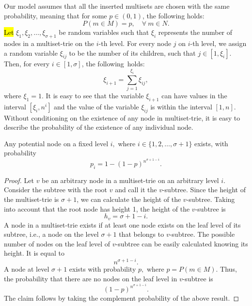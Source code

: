 \documentclass[algorithms,article,accept,pdftex,moreauthors]{Definitions/mdpi}
\begin{document}
Our model assumes that all the inserted multisets are chosen with the same probability,
meaning that for some $p\in (0,1)$, the following holds:
\[
P(m\in M) = p, \quad \forall~m\in N.
\]
%
\hl{Let} %
 $\xi_1, \xi_2, \ldots, \xi_{\sigma+1}$ be random variables such that $\xi_i$
represents the number of nodes in a multiset-trie on the $i$-th level. For every node $j$ 
on $i$-th level, we assign a random variable $\xi_{ij}$ to be the number of its children, 
such that $j\in[1,\xi_i].$ Then, for every $i\in[1,\sigma]$, the following~holds:%
\begin{equation}\label{eq:sum_recursive}
\xi_{i+1} = \sum_{j=1}^{\xi_i} \xi_{ij},
\end{equation}
%
where $\xi_1 = 1.$
%
It is easy to see that the variable $\xi_{i+1}$ can have values in the interval
$[\xi_i,n^{i}]$ and the value of the variable $\xi_{ij}$ is within the interval $[1,n].$
Without conditioning on the existence of any node in multiset-trie, 
it is easy to describe the probability of the existence of any individual node.

\begin{Lemma}\label{l:prob-node-existence}
Any potential node on a fixed level $i,$ where $i\in \{ 1,2,\ldots, \sigma +1 \}$ exists, %
with probability
\begin{equation}
p_i=1-(1-p)^{n^{\sigma + 1 -i}}.
\end{equation}
\end{Lemma}
\begin{proof}
Let $v$ be an arbitrary node in a multiset-trie on an arbitrary level $i.$ Consider
the subtree with the root $v$ and call it the $v$-subtree. Since the height of the
multiset-trie is $\sigma + 1$, we can calculate the height of the $v$-subtree.
Taking into account that the root node has height 1, the height of the $v$-subtree is
%
\[
h_v = \sigma + 1 - i.
\]
%
A node in a multiset-trie exists if at least one node exists on the leaf level of its
subtree, i.e., a node on the level $\sigma + 1$ that belongs to $v$-subtree. The possible
number of nodes on the leaf level of $v$-subtree can be easily calculated knowing its height.
It is equal to
%
\[
n^{\sigma + 1 - i}.
\]
%
A node at level $\sigma+1$ exists with probability $p,$ where $p = P(m\in M).$
Thus, the probability that there are no nodes on the leaf level in $v$-subtree is
%
\[
(1-p)^{n^{\sigma +1 - i}}.
\]
%
The claim follows by taking the complement probability of the above result. 
\end{proof}
\end{document}
